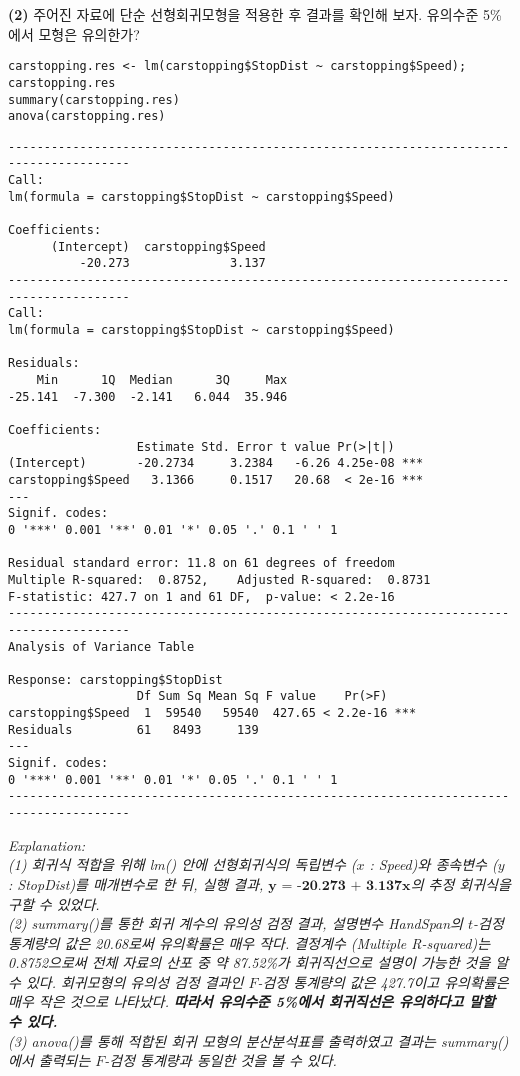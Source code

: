 \documentclass{article}
\begin{document}
\textbf{(2)} 주어진 자료에 단순 선형회귀모형을 적용한 후 결과를 확인해 보자. 유의수준 5\%에서 모형은 유의한가? 

\begin{lstlisting}[style={r-style}]
carstopping.res <- lm(carstopping$StopDist ~ carstopping$Speed); carstopping.res
summary(carstopping.res)
anova(carstopping.res)
\end{lstlisting}
\begin{lstlisting}[style={out-style}]
---------------------------------------------------------------------------------------
Call:
lm(formula = carstopping$StopDist ~ carstopping$Speed)

Coefficients:
      (Intercept)  carstopping$Speed  
          -20.273              3.137  
---------------------------------------------------------------------------------------
Call:
lm(formula = carstopping$StopDist ~ carstopping$Speed)

Residuals:
    Min      1Q  Median      3Q     Max 
-25.141  -7.300  -2.141   6.044  35.946 

Coefficients:
                  Estimate Std. Error t value Pr(>|t|)    
(Intercept)       -20.2734     3.2384   -6.26 4.25e-08 ***
carstopping$Speed   3.1366     0.1517   20.68  < 2e-16 ***
---
Signif. codes:  
0 '***' 0.001 '**' 0.01 '*' 0.05 '.' 0.1 ' ' 1

Residual standard error: 11.8 on 61 degrees of freedom
Multiple R-squared:  0.8752,	Adjusted R-squared:  0.8731 
F-statistic: 427.7 on 1 and 61 DF,  p-value: < 2.2e-16
---------------------------------------------------------------------------------------
Analysis of Variance Table

Response: carstopping$StopDist
                  Df Sum Sq Mean Sq F value    Pr(>F)    
carstopping$Speed  1  59540   59540  427.65 < 2.2e-16 ***
Residuals         61   8493     139                      
---
Signif. codes:  
0 '***' 0.001 '**' 0.01 '*' 0.05 '.' 0.1 ' ' 1
---------------------------------------------------------------------------------------
\end{lstlisting}
\emph{Explanation:  \\
(1) 회귀식 적합을 위해 lm() 안에 선형회귀식의 독립변수 ($x$ : Speed)와 종속변수 ($y$ : StopDist)를 매개변수로 한 뒤, 실행 결과, $\textbf{y = -20.273 + 3.137x}$의 추정 회귀식을 구할 수 있었다. \\
(2) summary()를 통한 회귀 계수의 유의성
검정 결과, 설명변수 HandSpan의 $t$-검정 통계량의 값은 20.68로써 유의확률은 매우 작다. 
결정계수 (Multiple R-squared)는 0.8752으로써 전체 자료의 산포 중 약 87.52\%가 회귀직선으로 설명이 가능한 것을 알 수 있다. 
회귀모형의 유의성 검정 결과인 $F$-검정 통계량의 값은
427.7이고 유의확률은 매우 작은 것으로 나타났다. \textbf{따라서 유의수준 5\%에서 회귀직선은 유의하다고 말할 수 있다.}  \\
(3) anova()를 통해 적합된 회귀 모형의 분산분석표를 출력하였고 결과는 summary()에서 출력되는 $F$-검정 통계량과 동일한 것을 볼 수 있다.} \\
\end{document}
